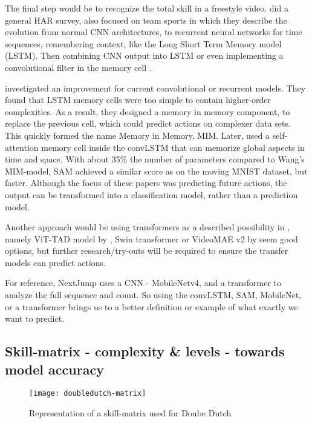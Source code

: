 The final step would be to recognize the total skill in a freestyle video.
\textcite{Yin_2024} did a general HAR survey, also focused on team sports in which they describe the evolution from normal CNN architectures, to recurrent neural networks for time sequences, remembering context, like the Long Short Term Memory model (LSTM). Then combining CNN output into LSTM or even implementing a convolutional filter in the memory cell \autocite{Shi_2015}.

\textcite{Wang_2019} investigated an improvement for current convolutional or recurrent models. They found that LSTM memory cells were too simple to contain higher-order complexities. As a result, they designed a memory in memory component, to replace the previous cell, which could predict actions on complexer data sets. This quickly formed the name Memory in Memory, MIM. Later, \textcite{Lin_2020} used a self-attention memory cell inside the convLSTM that can memorize global aspects in time and space. With about 35\% the number of parameters compared to Wang's MIM-model, SAM achieved a similar score as on the moving MNIST dataset, but faster. Although the focus of these papers was predicting future actions, the output can be transformed into a classification model, rather than a prediction model.

Another approach would be using transformers as a described possibility in \textcite{Yin_2024}, namely ViT-TAD model by \textcite{Yang_2023}, Swin transformer \textcite{Liu_2021} or VideoMAE v2 by \textcite{Wang_2023} seem good options, but further research/try-outs will be required to ensure the transfer models can predict actions.

For reference, NextJump uses a CNN - MobileNetv4, \autocite{MobileNetv4_2024} and a transformer to analyze the full sequence and count. So using the convLSTM, SAM, MobileNet, or a transformer brings us to a better definition or example of what exactly we want to predict.


\subsection{Skill-matrix - complexity \& levels - towards model accuracy}
\label{proposal-subsec:proposal-skillcomplexiteit}

\begin{figure}
    \centering
    \texttt{[image: doubledutch-matrix]}
    \caption[skill-matrix-DD]{Representation of a skill-matrix used for Doube Dutch}
    \label{proposal-fig:doubledutch-skill-matrix}
\end{figure}

